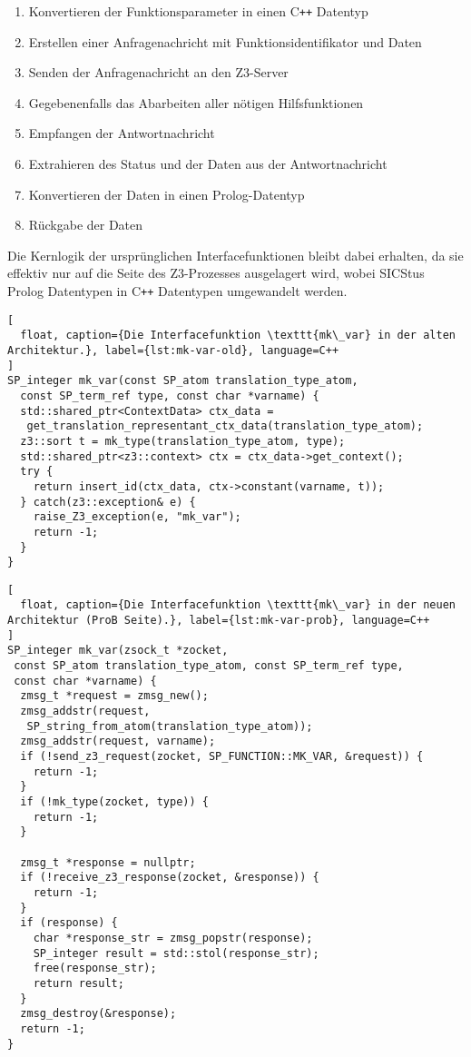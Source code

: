 \begin{enumerate}
  \item Konvertieren der Funktionsparameter in einen C\texttt{++} Datentyp
  \item Erstellen einer Anfragenachricht mit Funktionsidentifikator und Daten
  \item Senden der Anfragenachricht an den Z3-Server
  \item Gegebenenfalls das Abarbeiten aller nötigen Hilfsfunktionen
  \item Empfangen der Antwortnachricht
  \item Extrahieren des Status und der Daten aus der Antwortnachricht
  \item Konvertieren der Daten in einen Prolog-Datentyp
  \item Rückgabe der Daten
\end{enumerate}

Die Kernlogik der ursprünglichen Interfacefunktionen bleibt dabei erhalten, da sie effektiv nur auf die Seite des Z3-Prozesses ausgelagert wird,
wobei SICStus Prolog Datentypen in C\texttt{++} Datentypen umgewandelt werden.

\begin{lstlisting}[
  float, caption={Die Interfacefunktion \texttt{mk\_var} in der alten Architektur.}, label={lst:mk-var-old}, language=C++
]
SP_integer mk_var(const SP_atom translation_type_atom,
  const SP_term_ref type, const char *varname) {
  std::shared_ptr<ContextData> ctx_data =
   get_translation_representant_ctx_data(translation_type_atom);
  z3::sort t = mk_type(translation_type_atom, type);
  std::shared_ptr<z3::context> ctx = ctx_data->get_context();
  try {
    return insert_id(ctx_data, ctx->constant(varname, t));
  } catch(z3::exception& e) {
    raise_Z3_exception(e, "mk_var");
    return -1;
  }
}
\end{lstlisting}

\begin{lstlisting}[
  float, caption={Die Interfacefunktion \texttt{mk\_var} in der neuen Architektur (ProB Seite).}, label={lst:mk-var-prob}, language=C++
]
SP_integer mk_var(zsock_t *zocket,
 const SP_atom translation_type_atom, const SP_term_ref type,
 const char *varname) {
  zmsg_t *request = zmsg_new();
  zmsg_addstr(request,
   SP_string_from_atom(translation_type_atom));
  zmsg_addstr(request, varname);
  if (!send_z3_request(zocket, SP_FUNCTION::MK_VAR, &request)) {
    return -1;
  }
  if (!mk_type(zocket, type)) {
    return -1;
  }

  zmsg_t *response = nullptr;
  if (!receive_z3_response(zocket, &response)) {
    return -1;
  }
  if (response) {
    char *response_str = zmsg_popstr(response);
    SP_integer result = std::stol(response_str);
    free(response_str);
    return result;
  }
  zmsg_destroy(&response);
  return -1;
}
\end{lstlisting}

